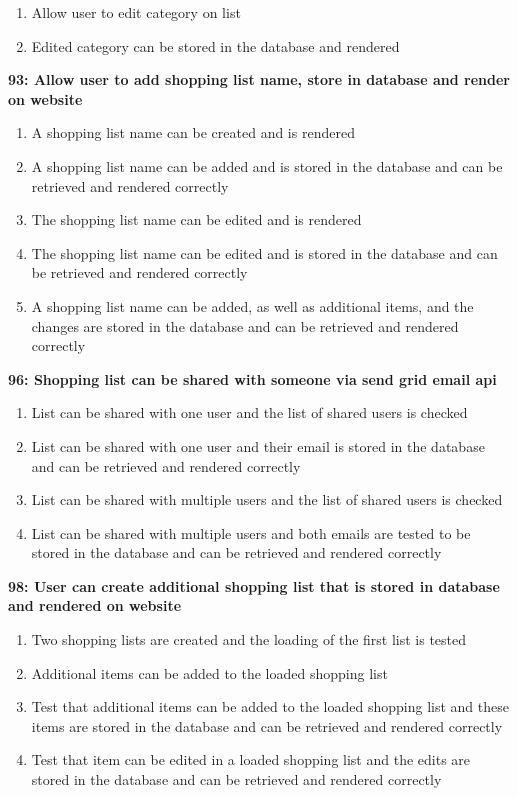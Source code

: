 \documentclass[10pt,onecolumn]{witseiepaper}
\begin{document}
\begin{enumerate}
	\item Allow user to edit category on list
	\item Edited category can be stored in the database and rendered
\end{enumerate}

\textbf{93: Allow user to add shopping list name, store in database and render on website}

\begin{enumerate}
	\item A shopping list name can be created and is rendered
	\item A shopping list name can be added and is stored in the database and can be retrieved and rendered correctly
	\item The shopping list name can be edited and is rendered
	\item The shopping list name can be edited and is stored in the database and can be retrieved and rendered correctly
	\item  A shopping list name can be added, as well as additional items, and the changes are stored in the database and can be retrieved and rendered correctly
\end{enumerate}

\textbf{96: Shopping list can be shared with someone via send grid email api}
\begin{enumerate}
	\item List can be shared with one user and the list of shared users is checked
	\item List can be shared with one user and their email is stored in the database and can be retrieved and rendered correctly
	\item List can be shared with multiple users and the list of shared users is checked
	\item List can be shared with multiple users and both emails are tested to be stored in the database and can be retrieved and rendered correctly
\end{enumerate}

%

\textbf{98: User can create additional shopping list that is stored in database and rendered on website}

\begin{enumerate}
	\item Two shopping lists are created and the loading of the first list is tested
	\item Additional items can be added to the loaded shopping list
	\item Test that additional items can be added to the loaded shopping list and these items are stored in the database and can be retrieved and rendered correctly
	\item Test that item can be edited in a loaded shopping list and the edits are stored in the database and can be retrieved and rendered correctly
\end{enumerate}
\end{document}
